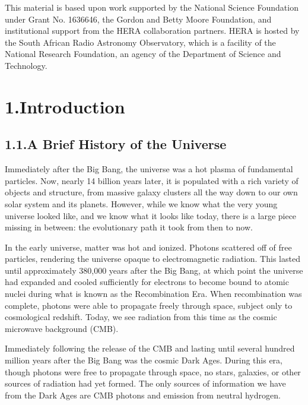\documentclass[12pt]{article}
\begin{document}
This material is based upon work supported by the National Science Foundation under Grant No. 1636646, the Gordon and Betty Moore Foundation, and institutional support from the HERA collaboration partners. HERA is hosted by the South African Radio Astronomy Observatory, which is a facility of the National Research Foundation, an agency of the Department of Science and Technology.

\clearpage
{}

\tocless\section{\hypertarget{sec:introduction}{1.\hspace{0.75em}Introduction}}

\tocless\subsection{\hypertarget{subsec:universe}{1.1.\hspace{0.75em}A Brief History of the Universe}}

Immediately after the Big Bang, the universe was a hot plasma of fundamental particles. Now, nearly 14 billion years later, it is populated with a rich variety of objects and structure, from massive galaxy clusters all the way down to our own solar system and its planets. However, while we know what the very young universe looked like, and we know what it looks like today, there is a large piece missing in between: the evolutionary path it took from then to now.

In the early universe, matter was hot and ionized. Photons scattered off of free particles, rendering the universe opaque to electromagnetic radiation. This lasted until approximately 380,000 years after the Big Bang, at which point the universe had expanded and cooled sufficiently for electrons to become bound to atomic nuclei during what is known as the Recombination Era. When recombination was complete, photons were able to propagate freely through space, subject only to cosmological redshift. Today, we see radiation from this time as the cosmic microwave background (CMB).

Immediately following the release of the CMB and lasting until several hundred million years after the Big Bang was the cosmic Dark Ages. During this era, though photons were free to propagate through space, no stars, galaxies, or other sources of radiation had yet formed. The only sources of information we have from the Dark Ages are CMB photons and emission from neutral hydrogen.
\end{document}
